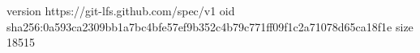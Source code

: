 version https://git-lfs.github.com/spec/v1
oid sha256:0a593ca2309bb1a7bc4bfe57ef9b352c4b79c771ff09f1c2a71078d65ca18f1e
size 18515
